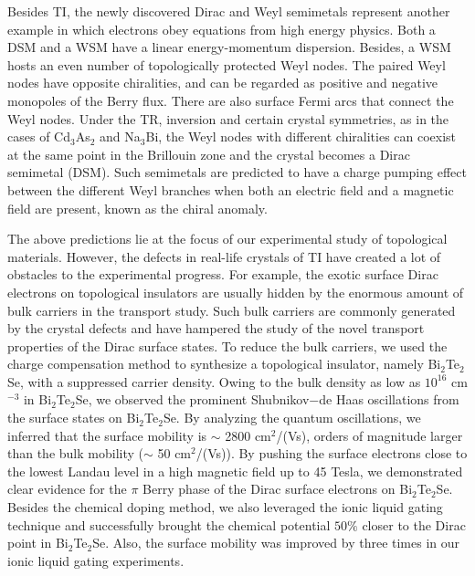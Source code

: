 Besides TI, the newly discovered Dirac and Weyl semimetals represent another example in which electrons obey equations from high energy physics. Both a DSM and a WSM have a linear energy-momentum dispersion. Besides, a WSM hosts an even number of topologically protected Weyl nodes. The paired Weyl nodes have opposite chiralities, and can be regarded as positive and negative monopoles of the Berry flux. There are also surface Fermi arcs that connect the Weyl nodes. Under the TR, inversion and certain crystal symmetries, as in the cases of Cd$_3$As$_2$ and Na$_3$Bi, the Weyl nodes with different chiralities can coexist at the same point in the Brillouin zone and the crystal becomes a Dirac semimetal (DSM). Such semimetals are predicted to have a charge pumping effect between the different Weyl branches when both an electric field and a magnetic field are present, known as the chiral anomaly.

The above predictions lie at the focus of our experimental study of topological materials. However, the defects in real-life crystals of TI have created a lot of obstacles to the experimental progress. For example, the exotic surface Dirac electrons on topological insulators are usually hidden by the enormous amount of bulk carriers in the transport study. Such bulk carriers are commonly generated by the crystal defects and have hampered the study of the novel transport properties of the Dirac surface states. To reduce the bulk carriers, we used the charge compensation method to synthesize a topological insulator, namely Bi$_2$Te$_2$Se, with a suppressed carrier density. Owing to the bulk density as low as  $10^{16}$ cm$^{-3}$ in Bi$_2$Te$_2$Se, we observed the prominent Shubnikov$-$de Haas oscillations from the surface states on Bi$_2$Te$_2$Se. By analyzing the quantum oscillations, we inferred that the surface mobility is $\sim$ 2800 cm$^2$/(Vs), orders of magnitude larger than the bulk mobility ($\sim$ 50 cm$^2$/(Vs)). By pushing the surface electrons close to the lowest Landau level in a high magnetic field up to 45 Tesla, we demonstrated clear evidence for the $\pi$ Berry phase of the Dirac surface electrons on Bi$_2$Te$_2$Se. Besides the chemical doping method, we also leveraged the ionic liquid gating technique and successfully brought the chemical potential $50 \%$ closer to the Dirac point in Bi$_2$Te$_2$Se. Also, the surface mobility was improved by three times in our ionic liquid gating experiments.

